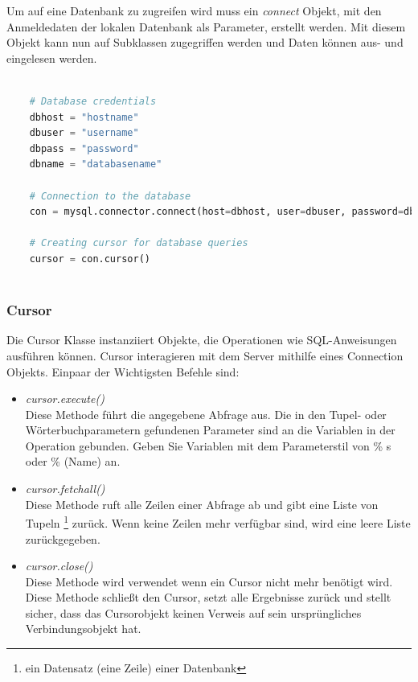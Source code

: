 Um auf eine Datenbank zu zugreifen wird muss ein \textit{connect} Objekt, mit den Anmeldedaten der lokalen Datenbank als Parameter, erstellt werden. Mit diesem Objekt kann nun auf Subklassen zugegriffen werden und Daten können aus- und eingelesen werden.

\begin{lstlisting}[language=Python, caption={Konfiguration der Datenbankschnittstelle},captionpos=b]
	
	# Database credentials
	dbhost = "hostname"
	dbuser = "username"
	dbpass = "password"
	dbname = "databasename"
	
	# Connection to the database
	con = mysql.connector.connect(host=dbhost, user=dbuser, password=dbpass, database=dbname)
	
	# Creating cursor for database queries
	cursor = con.cursor()
	
\end{lstlisting}

\newpage

\subsubsection{Cursor}

Die Cursor Klasse instanziiert Objekte, die Operationen wie SQL-Anweisungen ausführen können. Cursor interagieren mit dem Server mithilfe eines Connection Objekts.
Einpaar der Wichtigsten Befehle sind:

\begin{itemize}
	
	\item \textit{cursor.execute()} \\ Diese Methode führt die angegebene Abfrage aus. Die in den Tupel- oder Wörterbuchparametern gefundenen Parameter sind an die Variablen in der Operation gebunden. Geben Sie Variablen mit dem Parameterstil von \% s oder \% (Name) an.
	
	\item \textit{cursor.fetchall()} \\ Diese Methode ruft alle Zeilen einer Abfrage ab und gibt eine Liste von Tupeln \footnote{ein Datensatz (eine Zeile) einer Datenbank} zurück. Wenn keine Zeilen mehr verfügbar sind, wird eine leere Liste zurückgegeben.
	
	\item \textit{cursor.close()} \\ Diese Methode wird verwendet wenn ein Cursor nicht mehr benötigt wird. Diese Methode schließt den Cursor, setzt alle Ergebnisse zurück und stellt sicher, dass das Cursorobjekt keinen Verweis auf sein ursprüngliches Verbindungsobjekt hat.
	
\end{itemize}

